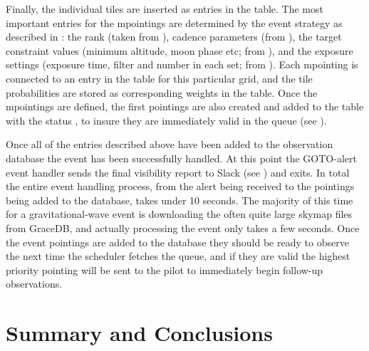 \begin{colsection}
Finally, the individual tiles are inserted as entries in the  table. The most important entries for the mpointings are determined by the event strategy as described in : the rank (taken from ), cadence parameters (from ), the target constraint values (minimum altitude, moon phase etc; from ), and the exposure settings (exposure time, filter and number in each set; from ). Each mpointing is connected to an entry in the  table for this particular grid, and the tile probabilities are stored as corresponding weights in the  table. Once the mpointings are defined, the first pointings are also created and added to the  table with the status , to insure they are immediately valid in the queue (see ).

Once all of the entries described above have been added to the observation database the event has been successfully handled. At this point the GOTO-alert event handler sends the final visibility report to Slack (see ) and exits. In total the entire event handling process, from the alert being received to the pointings being added to the database, takes under 10 seconds. The majority of this time for a gravitational-wave event is downloading the often quite large skymap files from GraceDB, and actually processing the event only takes a few seconds. Once the event pointings are added to the database they should be ready to observe the next time the scheduler fetches the queue, and if they are valid the highest priority pointing will be sent to the pilot to immediately begin follow-up observations.

\end{colsection}


\section{Summary and Conclusions}
\label{sec:alerts_conclusion}


